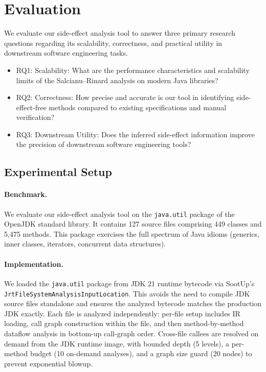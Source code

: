 \section{Evaluation}

We evaluate our side-effect analysis tool to answer three primary research questions regarding its scalability, correctness, and practical utility in downstream software engineering tasks.


\begin{itemize}
    \item RQ1: Scalability: What are the performance characteristics and scalability limits of the Salcianu--Rinard analysis on modern Java libraries?

    \item RQ2: Correctness: How precise and accurate is our tool in identifying side-effect-free methods compared to existing specifications and manual verification?

    \item RQ3: Downstream Utility: Does the inferred side-effect information improve the precision of downstream software engineering tools?
\end{itemize}

\subsection{Experimental Setup}

\paragraph{Benchmark.}
We evaluate our side-effect analysis tool on the \texttt{java.util} package of the OpenJDK standard library. It contains 127 source files comprising 449 classes and 5,475 methods.
This package exercises the full spectrum of Java idioms (generics, inner classes, iterators, concurrent data structures). 

\paragraph{Implementation.}
We loaded the \texttt{java.util} package from JDK 21 runtime bytecode via SootUp's \newline \texttt{JrtFileSystemAnalysisInputLocation}.
This avoids the need to compile JDK source files standalone and ensures the analyzed bytecode matches the production JDK exactly.
Each file is analyzed independently: per-file setup includes IR loading, call graph construction within the file, and then method-by-method dataflow analysis in bottom-up call-graph order.
Cross-file callees are resolved on demand from the JDK runtime image, with bounded depth (5 levels), a per-method budget (10 on-demand analyses), and a graph size guard (20 nodes) to prevent exponential blowup.







